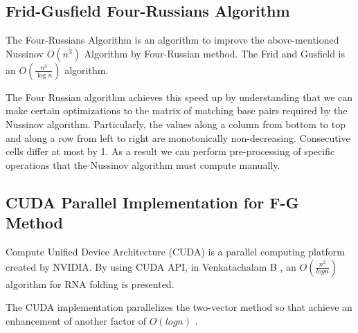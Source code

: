 \documentclass[12pt]{article}
\begin{document}
\subsection{Frid-Gusfield Four-Russians Algorithm}
\par The Four-Russians Algorithm \cite{gusfield} is an algorithm to improve the above-mentioned Nussinov $O(n^3)$ Algorithm by Four-Russian method. The Frid and Gusfield is an $O(\frac{n^3}{\log n})$ algorithm.
\par The Four Russian algorithm achieves this speed up by understanding that we can make certain optimizations to the matrix of matching base pairs required by the Nussinov algorithm. Particularly, the values along a column from bottom to top and along a row from left to right are monotonically non-decreasing. Consecutive cells differ at most by 1\cite{gusfield}. As a result we can perform pre-processing of specific operations that the Nussinov algorithm must compute manually.

\subsection{CUDA Parallel Implementation for F-G Method}
\par Compute Unified Device Architecture (CUDA) is a parallel computing platform created by NVIDIA. By using CUDA API, in Venkatachalam B \cite{balaji}, an $O(\frac{n^2}{logn})$ algorithm for RNA folding is presented.
\par The CUDA implementation parallelizes the two-vector method so that achieve an enhancement of another factor of $O(logn)$ \cite{balaji}. 
\end{document}
